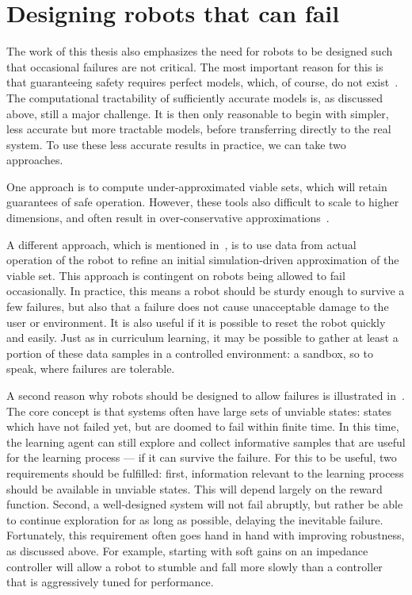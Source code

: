\section{Designing robots that can fail}
The work of this thesis also emphasizes the need for robots to be designed such that occasional failures are not critical. The most important reason for this is that guaranteeing safety requires perfect models, which, of course, do not exist~\cite{box1976science}. The computational tractability of sufficiently accurate models is, as discussed above, still a major challenge. It is then only reasonable to begin with simpler, less accurate but more tractable models, before transferring directly to the real system. To use these less accurate results in practice, we can take two approaches. \par
One approach is to compute under-approximated viable sets, which will retain guarantees of safe operation. However, these tools also difficult to scale to higher dimensions, and often result in over-conservative approximations~\cite{manchester2011regions}. \par
A different approach, which is mentioned in~\cite{heim2019learnable}, is to use data from actual operation of the robot to refine an initial simulation-driven approximation of the viable set. This approach is contingent on robots being allowed to fail occasionally. In practice, this means a robot should be sturdy enough to survive a few failures, but also that a failure does not cause unacceptable damage to the user or environment. It is also useful if it is possible to reset the robot quickly and easily. Just as in curriculum learning, it may be possible to gather at least a portion of these data samples in a controlled environment: a sandbox, so to speak, where failures are tolerable. \par

A second reason why robots should be designed to allow failures is illustrated in~\cite{heim2018unviable}. The core concept is that systems often have large sets of unviable states: states which have not failed yet, but are doomed to fail within finite time. In this time, the learning agent can still explore and collect informative samples that are useful for the learning process --- if it can survive the failure. For this to be useful, two requirements should be fulfilled: first, information relevant to the learning process should be available in unviable states. This will depend largely on the reward function. Second, a well-designed system will not fail abruptly, but rather be able to continue exploration for as long as possible, delaying the inevitable failure. Fortunately, this requirement often goes hand in hand with improving robustness, as discussed above. For example, starting with soft gains on an impedance controller will allow a robot to stumble and fall more slowly than a controller that is aggressively tuned for performance.


